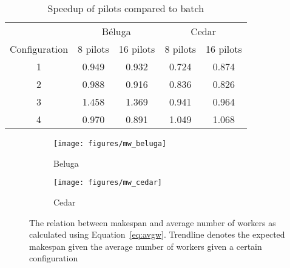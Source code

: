 \documentclass{IEEEtran}
\begin{document}
\begin{table}                                                                    
    \centering                                                                       
    \begin{tabular}{c|c|c|c|c}                                                             
        {} & \multicolumn{2}{c}{B\'eluga} & \multicolumn{2}{c}{Cedar}\\
    \rowcolor{headcolor}                                                             
    Configuration & 8 pilots & 16 pilots & 8 pilots & 16 pilots\\                               
    \hline                                                                           
    1 & 0.949 & 0.932 & 0.724 & 0.874\\                                               
    2 & 0.988 & 0.916 & 0.836 & 0.826\\                                               
    3 & 1.458 & 1.369 & 0.941 & 0.964\\
    4 & 0.970 & 0.891 & 1.049 & 1.068\\
    \end{tabular}                                                                    
    \setlength{\belowcaptionskip}{-10pt}                                             
    \caption{Speedup of pilots compared to batch}                                                    
    \label{table:speedup}                                                            
\end{table} 



    \begin{figure*}
        \centering
        \begin{subfigure}[b]{0.475\textwidth}
            \centering
            \texttt{[image: figures/mw\_beluga]}
            \caption[]%
            {{\small Beluga}}
            \label{fig:mwbeluga}
        \end{subfigure}
        \hfill
        \begin{subfigure}[b]{0.475\textwidth}
            \centering
            \texttt{[image: figures/mw\_cedar]}
            \caption[]%
            {{\small Cedar}}
            \label{fig:mwcedar}
        \end{subfigure}
        \caption[]
        {\small The relation between makespan and average number of workers as 
        calculated using Equation~\ref{eq:avgw}. Trendline denotes the expected makespan
        given the average number of workers given a certain configuration}
        \label{fig:mwall}
    \end{figure*}
\end{document}
